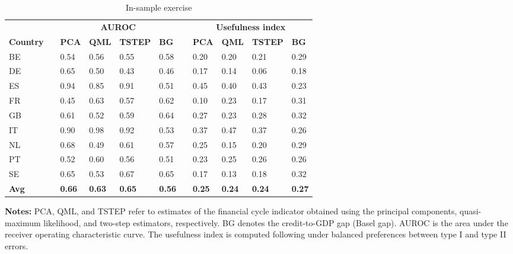 \begin{table}[htbp]
  \centering
  \caption{In-sample exercise}
  \small %
  \begin{adjustbox}{width=\textwidth}
    \begin{tabularx}{\textwidth}{l p{0.1cm} X X X X p{0.25cm} X X X X}
    \toprule
          &       & \multicolumn{4}{c}{\textbf{AUROC}} &       & \multicolumn{4}{c}{\textbf{Usefulness index}} \\
    \cmidrule{3-6}\cmidrule{8-11}
    \textbf{Country} &       & \textbf{PCA} & \textbf{QML} & \textbf{TSTEP} & \textbf{BG} &       & \textbf{PCA} & \textbf{QML} & \textbf{TSTEP} & \textbf{BG} \\
    \midrule
    BE    &       & 0.54  & 0.56  & 0.55  & 0.58  &       & 0.20  & 0.20  & 0.21  & 0.29 \\
    DE    &       & 0.65  & 0.50  & 0.43  & 0.46  &       & 0.17  & 0.14  & 0.06  & 0.18 \\
    ES    &       & 0.94  & 0.85  & 0.91  & 0.51  &       & 0.45  & 0.40  & 0.43  & 0.23 \\
    FR    &       & 0.45  & 0.63  & 0.57  & 0.62  &       & 0.10  & 0.23  & 0.17  & 0.31 \\
    GB    &       & 0.61  & 0.52  & 0.59  & 0.64  &       & 0.27  & 0.23  & 0.28  & 0.32 \\
    IT    &       & 0.90  & 0.98  & 0.92  & 0.53  &       & 0.37  & 0.47  & 0.37  & 0.26 \\
    NL    &       & 0.68  & 0.49  & 0.61  & 0.57  &       & 0.25  & 0.15  & 0.20  & 0.29 \\
    PT    &       & 0.52  & 0.60  & 0.56  & 0.51  &       & 0.23  & 0.25  & 0.26  & 0.26 \\
    SE    &       & 0.65  & 0.53  & 0.67  & 0.65  &       & 0.17  & 0.13  & 0.18  & 0.32 \\
    \midrule
    \textbf{Avg} &       & \textbf{0.66} & \textbf{0.63} & \textbf{0.65} & \textbf{0.56} &       & \textbf{0.25} & \textbf{0.24} & \textbf{0.24} & \textbf{0.27} \\
    \bottomrule
    \end{tabularx}%
  \end{adjustbox}
  \label{ew_in_sample}%
    
    \parbox{\textwidth}{\raggedright \footnotesize \textbf{Notes:} PCA, QML, and TSTEP refer to estimates of the financial cycle indicator obtained using the principal components, quasi-maximum likelihood, and two-step estimators, respectively. BG denotes the credit-to-GDP gap (Basel gap). AUROC is the area under the receiver operating characteristic curve. The usefulness index is computed following \citet{alessi2011quasi} under balanced preferences between type I and type II errors.}
  
\end{table}%

